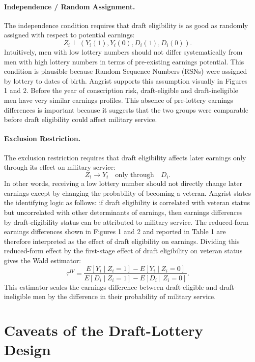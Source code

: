 \documentclass[11pt,a4paper]{article}
\begin{document}
\paragraph{Independence / Random Assignment.}
The independence condition requires that draft eligibility is as good as randomly
assigned with respect to potential earnings:
\[
    Z_i \perp (Y_i(1), Y_i(0), D_i(1), D_i(0)).
\]
Intuitively, men with low lottery numbers should not differ systematically from men
with high lottery numbers in terms of pre-existing earnings potential. This condition is
plausible because Random Sequence Numbers (RSNs) were assigned by lottery to dates of
birth. Angrist supports this assumption visually in Figures 1 and 2. Before the year of
conscription risk, draft-eligible and draft-ineligible men have very similar earnings
profiles. This absence of pre-lottery earnings differences is important because it suggests
that the two groups were comparable before draft eligibility could affect military service.

\paragraph{Exclusion Restriction.}
The exclusion restriction requires that draft eligibility affects later earnings only
through its effect on military service:
\[
    Z_i \rightarrow Y_i \quad \text{only through} \quad D_i.
\]
In other words, receiving a low lottery number should not directly change later earnings
except by changing the probability of becoming a veteran. Angrist states the identifying
logic as follows: if draft eligibility is correlated with veteran status but uncorrelated
with other determinants of earnings, then earnings differences by draft-eligibility status
can be attributed to military service. The reduced-form earnings differences shown in
Figures 1 and 2 and reported in Table 1 are therefore interpreted as the effect of draft
eligibility on earnings. Dividing this reduced-form effect by the first-stage effect of
draft eligibility on veteran status gives the Wald estimator:
\[
    \tau^{IV}
    =
    \frac{
        E[Y_i \mid Z_i = 1] - E[Y_i \mid Z_i = 0]
    }{
        E[D_i \mid Z_i = 1] - E[D_i \mid Z_i = 0]
    }.
\]
This estimator scales the earnings difference between draft-eligible and draft-ineligible
men by the difference in their probability of military service.





\section{Caveats of the Draft-Lottery Design}
\end{document}
